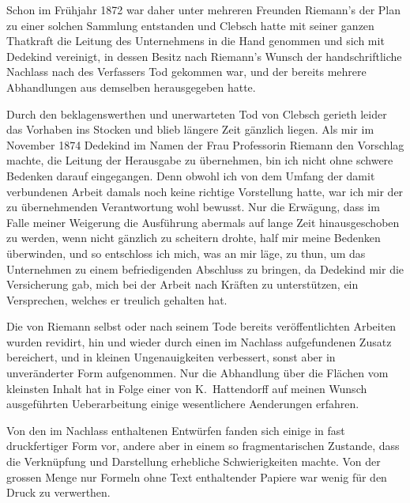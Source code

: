 \documentclass[11pt,a4paper]{article}
\theoremstyle{plain}
\theoremstyle{definition}
\begin{document}
Schon im Fr\"uhjahr 1872 war daher unter mehreren Freunden Riemann's der Plan zu einer solchen Sammlung entstanden und Clebsch hatte mit seiner ganzen Thatkraft die Leitung des Unternehmens in die Hand genommen und sich mit Dedekind vereinigt, in dessen Besitz nach Riemann's Wunsch der handschriftliche Nachlass nach des Verfassers Tod gekommen war, und der bereits mehrere Abhandlungen aus demselben herausgegeben hatte.

Durch den beklagenswerthen und unerwarteten Tod von Clebsch gerieth leider das Vorhaben ins Stocken und blieb l\"angere Zeit g\"anzlich liegen. Als mir im November 1874 Dedekind im Namen der Frau Professorin Riemann den Vorschlag machte, die Leitung der Herausgabe zu \"ubernehmen, bin ich nicht ohne schwere Bedenken darauf eingegangen. Denn obwohl ich von dem Umfang der damit verbundenen Arbeit damals noch keine richtige Vorstellung hatte, war ich mir der zu \"ubernehmenden Verantwortung wohl bewusst. Nur die Erw\"agung, dass im Falle meiner Weigerung die Ausf\"uhrung abermals auf lange Zeit hinausgeschoben zu werden, wenn nicht g\"anzlich zu scheitern drohte, half mir meine Bedenken \"uberwinden, und so entschloss ich mich, was an mir l\"age, zu thun, um das Unternehmen zu einem befriedigenden Abschluss zu bringen, da Dedekind mir die Versicherung gab, mich bei der Arbeit nach Kr\"aften zu unterst\"utzen, ein Versprechen, welches er treulich gehalten hat.

\clearpage

Die von Riemann selbst oder nach seinem Tode bereits ver\"offentlichten Arbeiten wurden revidirt, hin und wieder durch einen im Nachlass aufgefundenen Zusatz bereichert, und in kleinen Ungenauigkeiten verbessert, sonst aber in unver\"anderter Form aufgenommen. Nur die Abhandlung \"uber die Fl\"achen vom kleinsten Inhalt hat in Folge einer von K.\ Hattendorff auf meinen Wunsch ausgef\"uhrten Ueberarbeitung einige wesentlichere Aenderungen erfahren.

Von den im Nachlass enthaltenen Entw\"urfen fanden sich einige in fast druckfertiger Form vor, andere aber in einem so fragmentarischen Zustande, dass die Verkn\"upfung und Darstellung erhebliche Schwierigkeiten machte. Von der grossen Menge nur Formeln ohne Text enthaltender Papiere war wenig f\"ur den Druck zu verwerthen.
\end{document}
